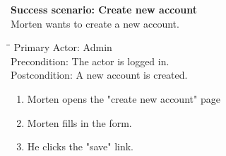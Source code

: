 \textbf{Success scenario: Create new account} \\
Morten wants to create a new account.
\begin{tabbing}
\hspace{5mm}\=\hspace{26mm}\=\kill
\>Primary Actor:\> Admin\\
\>Precondition:\> The actor is logged in.\\
\>Postcondition:\> A new account is created.
\end{tabbing}
\begin{enumerate} \setlength{\itemsep}{-1mm}
	\item Morten opens the "create new account" page
	\item Morten fills in the form.
	\item He clicks the "save" link.
\end{enumerate}
\newpage